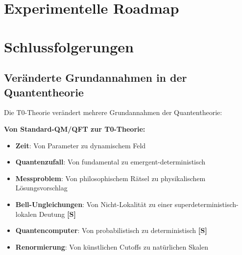 	
	\section{Experimentelle Roadmap}
	
	\begin{table}[htbp]
		\centering
		\caption{Experimentelle Tests für T0-QFT und QM}
		\label{tab:t0_experimental_tests}
	\end{table}
	
	\section{Schlussfolgerungen}
	
	\subsection{Veränderte Grundannahmen in der Quantentheorie}
	
	Die T0-Theorie verändert mehrere Grundannahmen der Quantentheorie:
	
	\begin{tcolorbox}[colback=green!5!white,colframe=green!75!black,title=T0-Übersicht]
		\textbf{Von Standard-QM/QFT zur T0-Theorie:}
		
		\begin{itemize}
			\item \textbf{Zeit}: Von Parameter zu dynamischem Feld
			\item \textbf{Quantenzufall}: Von fundamental zu emergent-deterministisch
			\item \textbf{Messproblem}: Von philosophischem Rätsel zu physikalischem Lösungsvorschlag
			\item \textbf{Bell-Ungleichungen}: Von Nicht-Lokalität zu einer superdeterministisch-lokalen Deutung \textbf{[S]}
			\item \textbf{Quantencomputer}: Von probabilistisch zu deterministisch \textbf{[S]}
			\item \textbf{Renormierung}: Von künstlichen Cutoffs zu natürlichen Skalen
		\end{itemize}
	\end{tcolorbox}
	
